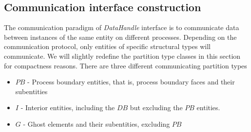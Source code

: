 \subsection{Communication interface construction}
\label{impl-grid-constructor-comm}

The communication paradigm of \dune{} \textit{DataHandle} interface is to communicate data between instances of the same entity on different processes. Depending on the communication protocol, only entities of specific structural types will communicate. We will slightly redefine the partition type classes in this section for compactness reasons. There are three different communicating partition types
\begin{itemize}
	\item $PB$ - Process boundary entities, that is, process boundary faces and their subentities
	\item $I$ - Interior entities, including the $DB$ but excluding the $PB$ entities.
	\item $G$ - Ghost elements and their subentities, excluding $PB$
\end{itemize}


